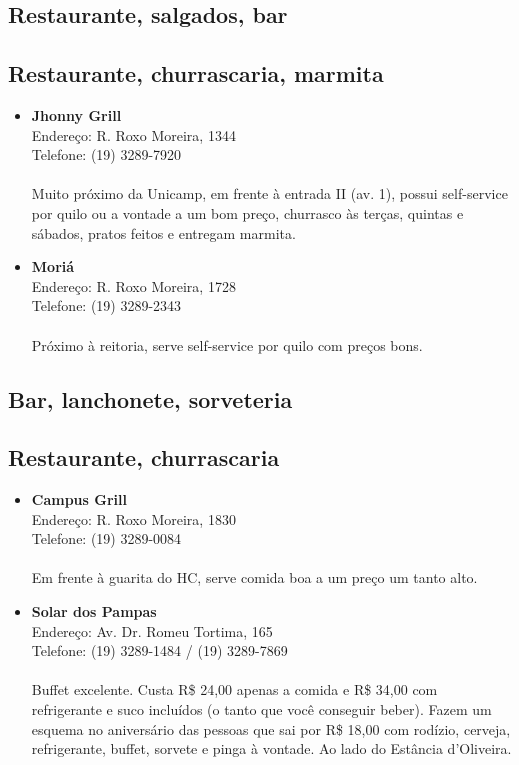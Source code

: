 \subsection{Restaurante, salgados, bar}

\subsection{Restaurante, churrascaria, marmita}

\begin{itemize}
\item \textbf{Jhonny Grill}
  \\Endereço: R. Roxo Moreira, 1344
  \\Telefone: (19) 3289-7920
  \\
  \\Muito próximo da Unicamp, em frente à entrada II (av. 1), possui
  self-service por quilo ou a vontade a um bom preço, churrasco às terças,
  quintas e sábados, pratos feitos e entregam marmita.
\end{itemize}

\begin{itemize}
\item \textbf{Moriá}
  \\Endereço: R. Roxo Moreira, 1728
  \\Telefone: (19) 3289-2343
  \\
  \\Próximo à reitoria, serve self-service por quilo com preços bons.
\end{itemize}

\subsection{Bar, lanchonete, sorveteria}

\subsection{Restaurante, churrascaria}

\begin{itemize}
\item \textbf{Campus Grill}
  \\Endereço: R. Roxo Moreira, 1830
  \\Telefone: (19) 3289-0084
  \\
  \\Em frente à guarita do HC, serve comida boa a um preço um tanto alto.
\item \textbf{Solar dos Pampas}
  \\Endereço: Av. Dr. Romeu Tortima, 165
  \\Telefone: (19) 3289-1484 / (19) 3289-7869
  \\
  \\Buffet excelente. Custa R\$ 24,00 apenas a comida e R\$ 34,00 com
  refrigerante e suco incluídos (o tanto que você conseguir beber). Fazem um
  esquema no aniversário das pessoas que sai por R\$ 18,00 com rodízio,
  cerveja, refrigerante, buffet, sorvete e pinga à vontade. Ao lado do Estância
  d'Oliveira.
\end{itemize}

